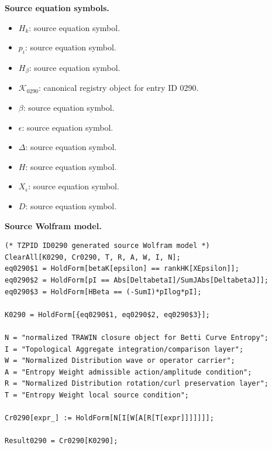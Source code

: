 \begin{minipage}[t]{0.49\linewidth}
\begingroup
\small
\raggedright
\textbf{Source equation symbols.}\par
\begin{itemize}[leftmargin=1.35em,itemsep=1pt,topsep=1pt,parsep=0pt]
    \item $H_k$: source equation symbol.
    \item $p_i$: source equation symbol.
    \item $H_{\beta}$: source equation symbol.
    \item $\mathcal{K}_{0290}$: canonical registry object for entry ID 0290.
    \item $\beta$: source equation symbol.
    \item $\epsilon$: source equation symbol.
    \item $\Delta$: source equation symbol.
    \item $H$: source equation symbol.
    \item $X_{\epsilon}$: source equation symbol.
    \item $D$: source equation symbol.
\end{itemize}
\endgroup
\end{minipage}\hfill
\begin{minipage}[t]{0.47\linewidth}
\begingroup
\scriptsize
\raggedright
\textbf{Source Wolfram model.}\par
\begin{Verbatim}[fontsize=\tiny,breaklines=true,breakanywhere=true]
(* TZPID ID0290 generated source Wolfram model *)
ClearAll[K0290, Cr0290, T, R, A, W, I, N];
eq0290$1 = HoldForm[betaK[epsilon] == rankHK[XEpsilon]];
eq0290$2 = HoldForm[pI == Abs[DeltabetaI]/SumJAbs[DeltabetaJ]];
eq0290$3 = HoldForm[HBeta == (-SumI)*pIlog*pI];

K0290 = HoldForm[{eq0290$1, eq0290$2, eq0290$3}];

N = "normalized TRAWIN closure object for Betti Curve Entropy";
I = "Topological Aggregate integration/comparison layer";
W = "Normalized Distribution wave or operator carrier";
A = "Entropy Weight admissible action/amplitude condition";
R = "Normalized Distribution rotation/curl preservation layer";
T = "Entropy Weight local source condition";

Cr0290[expr_] := HoldForm[N[I[W[A[R[T[expr]]]]]]];

Result0290 = Cr0290[K0290];
\end{Verbatim}
\endgroup
\end{minipage}

